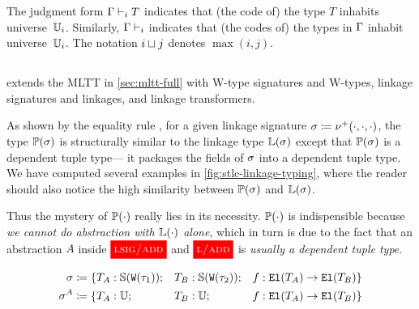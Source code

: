 The judgment form $\goodType{\Gm}{T}{i}$ indicates that (the code of) the type $T$
inhabits universe~$\cU_i$.
Similarly, $\goodCtx{\Gm}{i}$ indicates that (the codes of) the types in $\Gm$
inhabit universe~$\cU_i$.
The notation $i \lcup j$ denotes $\max(i,j)$.




\subsection{\TT}
\label{sec:fmltt-full}

\TT extends the MLTT in \cref{sec:mltt-full} with W-type signatures and W-types,
linkage signatures and linkages, and linkage transformers.






As shown by the equality rule ,
for a given linkage signature $\lsig \coloneq \LSigAdd{\cdot}{\cdot}{\cdot}$,
the type $\TyTkg{\lsig}$ is structurally similar to the linkage type $\TyLkg{\lsig}$
except that $\TyTkg{\lsig}$ is a dependent tuple type---%
it packages the fields of $\lsig$ into a dependent tuple type.
%
We have computed several examples in
\cref{fig:stlc-linkage-typing}, where the reader should also notice the high
similarity between $\TyTkg{\lsig}$ and $\TyLkg{\lsig}$.

Thus the mystery of $\TyTkg{\cdot}$ really lies in its necessity. $\TyTkg{\cdot}$ is indispensible because \emph{we cannot do abstraction with $\TyLkg{\cdot}$ alone}, which in turn is due to the fact that an abstraction $A$ inside $\ruleref{lsig/add}$ and $\ruleref{l/add}$ is \emph{usually a dependent tuple type}. 

\begin{align*}
  \lsig &\coloneq \{ T_A : \TyS{\wcode{\wsig_1}}; &&T_B : \TyS{\wcode{\wsig_2}}; &&f : \El{T_A} \to \El{T_B} \} \\
  \lsig^A &\coloneq \{T_A : \cU; &&T_B : \cU; &&f : \El{T_A} \to \El{T_B} \}
\end{align*}

